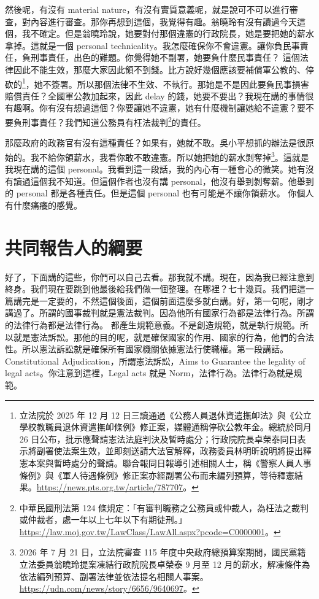 \hypertarget{w05:cue:128}{}然後呢，有沒有 material nature，有沒有實質意義呢，就是說可不可以進行審查，對內容進行審查。那你再想到這個，我覺得有趣。翁曉玲有沒有讀過今天這個，我不確定。但是翁曉玲說，她要對付那個違憲的行政院長，她是要把她的薪水拿掉。這就是一個 personal technicality。我怎麼確保你不會違憲。讓你負民事責任，負刑事責任，出色的難題。你覺得她不副署，她要負什麼民事責任？
\hypertarget{w05:cue:129}{}這個法律因此不能生效，那麼大家因此領不到錢。比方說好幾個應該要補償軍公教的、停砍的\footnote{立法院於 2025 年 12 月 12 日三讀通過《公務人員退休資遣撫卹法》與《公立學校教職員退休資遣撫卹條例》修正案，媒體通稱停砍公教年金。總統於同月 26 日公布，批示應聲請憲法法庭判決及暫時處分；行政院院長卓榮泰同日表示將副署使法案生效，並即刻送請大法官解釋，政務委員林明昕說明將提出釋憲本案與暫時處分的聲請。聯合報同日報導引述相關人士，稱《警察人員人事條例》與《軍人待遇條例》修正案亦經副署公布而未編列預算，等待釋憲結果。\url{https://news.pts.org.tw/article/787707}。}，她不簽署。所以那個法律不生效、不執行。那她是不是因此要負民事損害賠償責任？全國軍公教加起來，因此 delay 的錢，她要不要出？我現在講的事情很有趣啊。你有沒有想過這個？你要讓她不違憲，她有什麼機制讓她給不違憲？要不要負刑事責任？我們知道公務員有枉法裁判\footnote{中華民國刑法第 124 條規定：「有審判職務之公務員或仲裁人，為枉法之裁判或仲裁者，處一年以上七年以下有期徒刑。」\url{https://law.moj.gov.tw/LawClass/LawAll.aspx?pcode=C0000001}。}的責任。

\hypertarget{w05:cue:130}{}那麼政府的政務官有沒有這種責任？如果有，她就不敢。吳小平想抓的辦法是很原始的。我不給你領薪水，我看你敢不敢違憲。所以她把她的薪水剝奪掉\footnote{2026 年 7 月 21 日，立法院審查 115 年度中央政府總預算案期間，國民黨籍立法委員翁曉玲提案凍結行政院院長卓榮泰 9 月至 12 月的薪水，解凍條件為依法編列預算、副署法律並依法提名相關人事案。\url{https://udn.com/news/story/6656/9640697}。}。這就是我現在講的這個 personal。我看到這一段話，我的內心有一種會心的微笑。她有沒有讀過這個我不知道。但這個作者也沒有講 personal，他沒有舉到剝奪薪。他舉到的 personal 都是各種責任。但是這個 personal 也有可能是不讓你領薪水。
\hypertarget{w05:cue:131}{}你個人有什麼痛癢的感覺。

\section{共同報告人的綱要}

\hypertarget{w05:cue:132}{}好了，下面講的這些，你們可以自己去看。那我就不講。現在，因為我已經注意到終身。我們現在要跳到他最後給我們做一個整理。在哪裡？七十幾頁。我們把這一篇講完是一定要的，不然這個後面，這個前面這麼多就白講。好，第一句呢，剛才講過了。所謂的國事裁判就是憲法裁判。因為他所有國家行為都是法律行為。所謂的法律行為都是法律行為。
\hypertarget{w05:cue:133}{}都產生規範意義。不是創造規範，就是執行規範。所以就是憲法訴訟。那他的目的呢，就是確保國家的作用、國家的行為，他們的合法性。所以憲法訴訟就是確保所有國家機關依據憲法行使職權。第一段講話。
\hypertarget{w05:cue:134}{}Constitutional Adjudication，所謂憲法訴訟，Aims to Guarantee the legality of legal acts。你注意到這裡，Legal acts 就是 Norm，法律行為。法律行為就是規範。

